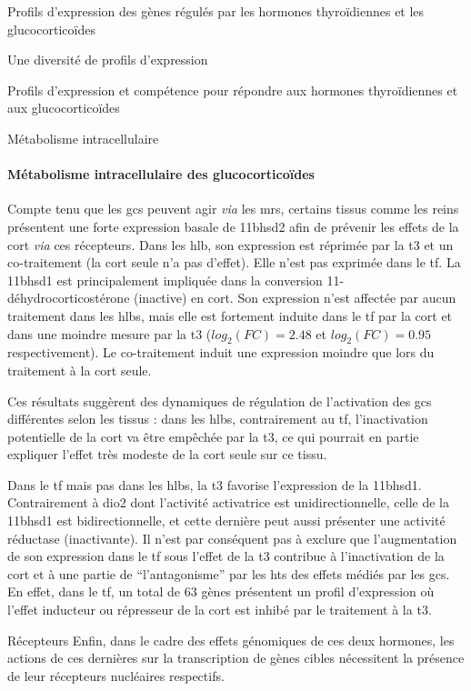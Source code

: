 \documentclass[../main.tex]{subfiles}
\begin{document}
\begin{chapter}{Profils d'expression des gènes régulés par les hormones thyroïdiennes et les glucocorticoïdes}
\begin{section}{Une diversité de profils d'expression}
\begin{subsection}{Profils d'expression et compétence pour répondre aux hormones thyroïdiennes et aux glucocorticoïdes}
\begin{subsubsection}{Métabolisme intracellulaire}
\paragraph{Métabolisme intracellulaire des glucocorticoïdes}
Compte tenu que les \glspl{gc} peuvent agir \textit{via} les \glspl{mr}, certains tissus comme les reins présentent une forte expression basale de \gls{11bhsd2} afin de prévenir les effets de la \gls{cort} \textit{via} ces récepteurs.
Dans les \gls{hlb}, son expression est réprimée par la \gls{t3} et un co-traitement (la \gls{cort} seule n'a pas d'effet).
Elle n'est pas exprimée dans le \gls{tf}.
La \gls{11bhsd1} est principalement impliquée dans la conversion 11-déhydrocorticostérone (inactive) en \gls{cort}.
Son expression n'est affectée par aucun traitement dans les \glspl{hlb}, mais elle est fortement induite dans le \gls{tf} par la \gls{cort} et dans une moindre mesure par la \gls{t3} ($log_2(FC)=2.48$ et $log_2(FC)=0.95$ respectivement).
Le co-traitement induit une expression moindre que lors du traitement à la \gls{cort} seule.
\par
Ces résultats suggèrent des dynamiques de régulation de l'activation des \glspl{gc} différentes selon les tissus :
dans les \glspl{hlb}, contrairement au \gls{tf}, l'inactivation potentielle de la \gls{cort} va être empêchée par la \gls{t3}, ce qui pourrait en partie expliquer l'effet très modeste de la \gls{cort} seule sur ce tissu.
\par
Dans le \gls{tf} mais pas dans les \glspl{hlb}, la \gls{t3} favorise l'expression de la \gls{11bhsd1}.
Contrairement à \gls{dio2} dont l'activité activatrice est unidirectionnelle, celle de la \gls{11bhsd1} est bidirectionnelle, et cette dernière peut aussi présenter une activité réductase (inactivante).
Il n'est par conséquent pas à exclure que l'augmentation de son expression dans le \gls{tf} sous l'effet de la \gls{t3} contribue à l'inactivation de la \gls{cort} et à une partie de ``l'antagonisme'' par les \glspl{ht} des effets médiés par les \glspl{gc}.
En effet, dans le \gls{tf}, un total de 63 gènes présentent un profil d'expression où l'effet inducteur ou répresseur de la \gls{cort} est inhibé par le traitement à la \gls{t3}.
\end{subsubsection}

\begin{subsubsection}{Récepteurs}
Enfin, dans le cadre des effets génomiques de ces deux hormones, les actions de ces dernières sur la transcription de gènes cibles nécessitent la présence de leur récepteurs nucléaires respectifs.


\end{subsubsection}
\end{subsection}
\end{section}
\end{chapter}
\end{document}
